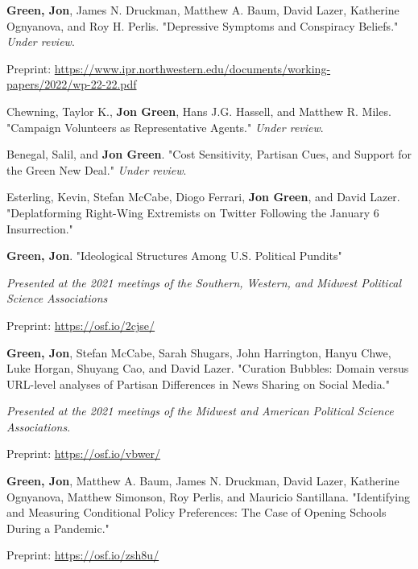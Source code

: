\documentclass[letterpaper]{article}
\renewenvironment{itemize}{
  \begin{list}{}{
    \setlength{\leftmargin}{1.5em}
  }
}{
  \end{list}
}
\begin{document}
\begin{itemize}
\item \textbf{Green, Jon}, James N. Druckman, Matthew A. Baum, David Lazer, Katherine Ognyanova, and Roy H. Perlis. "Depressive Symptoms and Conspiracy Beliefs." \textit{Under review}.
\begin{itemize}
\item Preprint: \url{https://www.ipr.northwestern.edu/documents/working-papers/2022/wp-22-22.pdf}
\end{itemize} 

\item Chewning, Taylor K., \textbf{Jon Green}, Hans J.G. Hassell, and Matthew R. Miles. "Campaign Volunteers as Representative Agents." \textit{Under review}.

\item Benegal, Salil, and \textbf{Jon Green}. "Cost Sensitivity, Partisan Cues, and Support for the Green New Deal." \textit{Under review}.

\item Esterling, Kevin, Stefan McCabe, Diogo Ferrari, \textbf{Jon Green}, and David Lazer. "Deplatforming Right-Wing Extremists on Twitter Following the January 6 Insurrection." 

\item \textbf{Green, Jon}. "Ideological Structures Among U.S. Political Pundits" 
\begin{itemize}
\item \textit{Presented at the 2021 meetings of the Southern, Western, and Midwest Political Science Associations}
\item Preprint: \url{https://osf.io/2cjse/}
\end{itemize}

\item \textbf{Green, Jon}, Stefan McCabe, Sarah Shugars, John Harrington, Hanyu Chwe, Luke Horgan, Shuyang Cao, and David Lazer.  "Curation Bubbles: Domain versus URL-level analyses of Partisan Differences in News Sharing on Social Media."
\begin{itemize}
\item \textit{Presented at the 2021 meetings of the Midwest and American Political Science Associations}.
\item Preprint: \url{https://osf.io/vbwer/}
\end{itemize} 

\item  \textbf{Green, Jon}, Matthew A. Baum, James N. Druckman, David Lazer, Katherine Ognyanova, Matthew Simonson, Roy Perlis, and Mauricio Santillana. "Identifying and Measuring Conditional Policy Preferences: The Case of Opening Schools During a Pandemic." 
\begin{itemize}
\item Preprint: \url{https://osf.io/zsh8u/}
\end{itemize}


\end{itemize}
\end{document}
